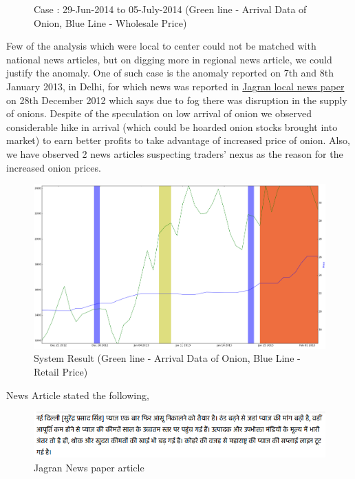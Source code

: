 \documentclass[a4paper,10pt]{article}
\begin{document}
\begin{itemize}
\begin{figure}[H]
      \caption{Case : 29-Jun-2014 to 05-July-2014 (Green line - Arrival Data of Onion, Blue Line - Wholesale Price)}
      \label{fig:Delhi_WSvsArrival_ill1}
      \end{figure}
\end{itemize}


Few of the analysis which were local to center could not be matched with national news articles, but on digging more in regional news article, we could justify the anomaly. One of such case is the anomaly reported on 7th and 8th January 2013, in Delhi, for which news was reported in \href{http://www.jagran.com/news/business-onion-price-affected-from-fog-9987751.html}{Jagran local news paper} on 28th December 2012 which says due to fog there was disruption in the supply of onions. Despite of the speculation on low arrival of onion we observed considerable hike in arrival (which could be hoarded onion stocks brought into market) to earn better profits to take advantage of increased price of onion. Also, we have observed 2 news articles suspecting traders' nexus as the reason for the increased onion prices.


			\begin{figure}[H]
		    	\centering
  		    	\includegraphics[width=1.1\textwidth]{graphs/localDelhiRegionalNewsPlusNexus.png}
		    	\caption{System Result (Green line - Arrival Data of Onion, Blue Line - Retail Price)}
		    	\label{fig:localExample}
			\end{figure}
			
News Article stated the following,

		\begin{figure}[H]
		    	\centering
  		    	\includegraphics[width=1.1\textwidth]{graphs/localDelhiFog.png}
		    	\caption{Jagran News paper article}
		    	\label{fig:localDelhiFog}
		\end{figure}
		
\end{document}
